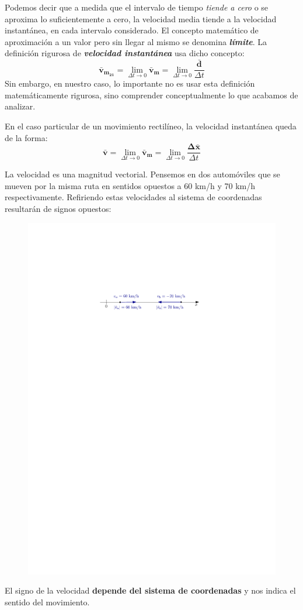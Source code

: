 Podemos decir que a medida que el intervalo de tiempo {\em tiende a cero} o se aproxima lo suficientemente a cero,  la velocidad media tiende a la velocidad instantánea, en cada intervalo considerado. El concepto matemático de aproximación a un valor pero sin llegar al mismo se denomina {\bf \em límite}. La definición rigurosa de {\bf \em velocidad instantánea} usa dicho concepto:
$$\mathbold{\bar{v}_{m_{21}}} = \lim_{\Delta t \rightarrow 0} \mathbold{\bar{v}_m} = \lim_{\Delta t \rightarrow 0}\frac{\mathbold{\bar{d}}}{\Delta t}$$
Sin embargo, en nuestro caso, lo importante no es usar esta definición matemáticamente rigurosa, sino comprender conceptualmente lo que acabamos de analizar.

En el caso particular de un movimiento rectilíneo, la velocidad instantánea queda de la forma:
$$\mathbold{\bar{v}} = \lim_{\Delta t \rightarrow 0} \mathbold{\bar{v}_m} = \lim_{\Delta t \rightarrow 0} \frac{\mathbold{\Delta \bar{x}}}{\Delta t}$$


La velocidad es una magnitud vectorial. Pensemos en dos automóviles que se mueven por la misma ruta en sentidos opuestos a 60 km/h y 70 km/h respectivamente. Refiriendo estas velocidades al sistema de coordenadas resultarán de signos opuestos:


\begin{figure}[h!]
\centering
 \includegraphics[width=.6\textwidth]{img/velocidad_instantanea2.pdf}
\end{figure}
El signo de la velocidad \textbf{depende del sistema de coordenadas} y nos indica el sentido del movimiento.



